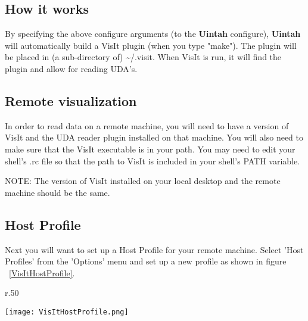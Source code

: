 \documentclass[11pt,fleqn]{book} %
\begin{document}
\subsection{How it works}
By specifying the above configure arguments (to the \textbf{Uintah}
configure), \textbf{Uintah} will automatically build a VisIt plugin
(when you type "make"). The plugin will be placed in (a sub-directory
of) \textasciitilde/.visit. When VisIt is run, it will find the plugin
and allow for reading UDA's.



\subsection{Remote visualization}
In order to read data on a remote machine, you will need to have a
version of VisIt and the UDA reader plugin installed on that
machine. You will also need to make sure that the VisIt executable is
in your path. You may need to edit your shell's .rc file so that the
path to VisIt is included in your shell's PATH variable.

NOTE: The version of VisIt installed on your local desktop and the
remote machine should be the same.

\subsection{Host Profile}
Next you will want to set up a Host Profile for your remote
machine. Select 'Host Profiles' from the 'Options' menu and set up a
new profile as shown in figure ~\ref{VisItHostProfile}.






\begin{wrapfigure}{r}{.50\textwidth}

   \vspace{-25pt}
  \begin{center}
    \texttt{[image: VisItHostProfile.png]}
  \end{center}
  \caption{Setting up Host Profile}
   \vspace{-20pt}
  \label{VisItHostProfile}

\end{wrapfigure}
\end{document}
